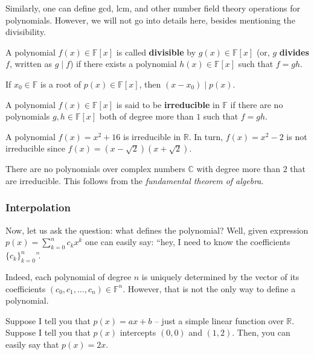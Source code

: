 \documentclass[../lecture-notes.tex]{subfiles}
\begin{document}
Similarly, one can define $\text{gcd}$, $\text{lcm}$, and other number field theory operations for polynomials. However, we will not go into details here, besides mentioning the divisibility.

\begin{definition}
    A polynomial $f(x) \in \mathbb{F}[x]$ is called \textbf{divisible} by $g(x) \in \mathbb{F}[x]$ (or, $g$ \textbf{divides} $f$, written as $g \mid f$) if there exists a polynomial $h(x) \in \mathbb{F}[x]$ such that $f=gh$.
\end{definition}

\begin{theorem}
    If $x_0 \in \mathbb{F}$ is a root of $p(x) \in \mathbb{F}[x]$, then $(x-x_0) \mid p(x)$.
\end{theorem}

\begin{definition}
    A polynomial $f(x) \in \mathbb{F}[x]$ is said to be \textbf{irreducible} in $\mathbb{F}$ if there are no polynomials $g,h \in \mathbb{F}[x]$ both of degree more than $1$ such that $f = gh$.
\end{definition}

\begin{example}
    A polynomial $f(x) = x^2+16$ is irreducible in $\mathbb{R}$. In turn, $f(x) = x^2-2$ is not irreducible since $f(x) = (x-\sqrt{2})(x+\sqrt{2})$. 
\end{example}

\begin{example}
    There are no polynomials over complex numbers $\mathbb{C}$ with degree more than $2$ that are irreducible. This follows from the \textit{fundamental theorem of algebra}.
\end{example}

\subsubsection{Interpolation}

Now, let us ask the question: what defines the polynomial? Well, given expression $p(x) = \sum_{k=0}^n c_kx^k$ one can easily say: ``hey, I need to know the coefficients $\{c_k\}_{k=0}^n$''.

Indeed, each polynomial of degree $n$ is uniquely determined by the vector of its coefficients $(c_0,c_1,\dots,c_n) \in \mathbb{F}^n$. However, that is not the only way to define a polynomial.

Suppose I tell you that $p(x) = ax + b$ -- just a simple linear function over $\mathbb{R}$. Suppose I tell you that $p(x)$ intercepts $(0,0)$ and $(1,2)$. Then, you can easily say that $p(x) = 2x$. 
\end{document}

